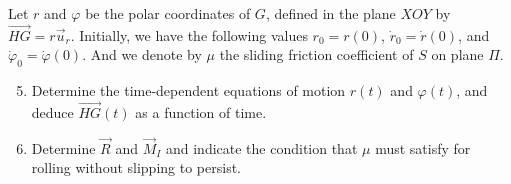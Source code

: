 \documentclass[12pt]{article}
\begin{document}
Let $r$ and $\varphi$ be the polar coordinates of $G$, defined in the plane $XOY$ by $\overrightarrow{HG} = r\vec{u}_r$. Initially, we have the following values $r_0 = r(0)$, $\dot{r}_0 = \dot{r}(0)$, and $\dot{\varphi}_0 = \dot{\varphi}(0)$. And we denote by $\mu$ the sliding friction coefficient of $S$ on plane $\Pi$.

\begin{enumerate}
    \setcounter{enumi}{4}
    \item Determine the time-dependent equations of motion $r(t)$ and $\varphi(t)$, and deduce $\overrightarrow{HG}(t)$ as a function of time.
    \item Determine $\vec{R}$ and $\vec{M}_I$ and indicate the condition that $\mu$ must satisfy for rolling without slipping to persist.
\end{enumerate}
\end{document}
